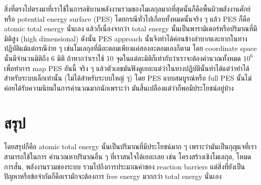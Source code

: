 สิ่งที่ตรงไปตรงมาที่เราใช้ในการอธิบานพลังงานรวมของโมเลกุลมากที่สุดนั้นก็คือพื้นผิวพลังงานศักย์หรือ potential energy 
surface (PES) โดยกรณีทั่วไปเกือบทั้งหมดนั้นจริง ๆ แล้ว PES ก็คือ atomic total energy นั่นเอง 
แล้วก็เนื่องจากว่า total energy นั้นเป็นพารามิเตอร์หรือปริมาณที่มีมิติสูง (high dimensional) ดังนั้น PES approach 
นั้นจึงทำได้ค่อนข้างลำบากและยากในทางปฏิบัติแม้แต่กรณีง่าย ๆ เช่นโมเลกุลที่มีอะตอมเพียงแค่สองอะตอมเองก็ตาม 
โดย coordinate space นั้นมีจำนวนมิติถึง 6 มิติ ถ้าหากว่าเราใช้ 10 จุดในแต่ละมิติก็เท่ากับว่าเราจะต้องคำนวณทั้งหมด 
$10^{6}$ เพื่อทำการ map PES อันนี้ จริง ๆ แล้วตัวเลขมันฟังดูเยอะแต่ว่าในทางปฏิบัตินั้นทำได้แต่ว่าทำได้สำหรับระบบเล็กเท่านั้น 
(ไม่ได้สำหรับระบบใหญ่ ๆ) โดย PES แบบสมบูรณ์หรือ full PES นั้นไม่ค่อยได้รับความนิยมในการคำนวณมากนักเพราะว่า%
มันสิ้นเปลืองแต่ว่าก็พอมีประโยชน์อยู่บ้าง

\section{สรุป}

โดยสรุปก็คือ atomic total energy นั้นเป็นปริมาณที่มีประโยชน์มาก ๆ เพราะว่ามันเป็นกุญแจที่เราสามารถใช้ในการ%
คำนวณหาปริมาณอื่น ๆ ที่เราสนใจได้เยอะเลย เช่น โครงสร้างเชิงโมเลกุล, โหมดการสั่น, พลังงานรวมของระบบ 
รวมไปถึงการประมาณค่าของ reaction barriers แต่สิ่งที่ยังเป็นปัญหาหรือข้อจำกัดก็คือเรามักจะต้องการ free energy 
มากกว่า total energy นั่นเอง 
